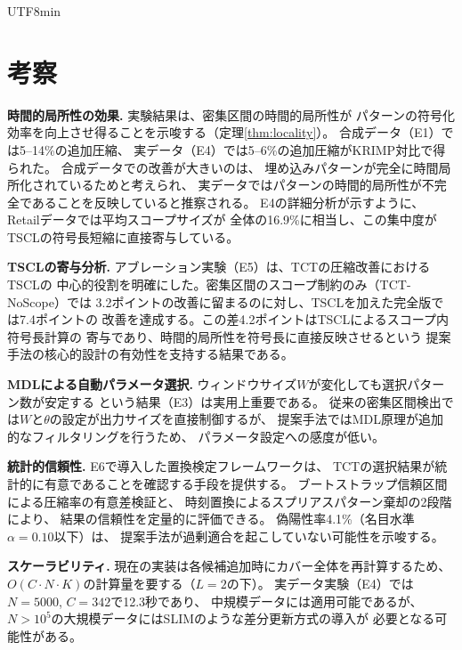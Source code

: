 \documentclass[11pt,a4paper]{article}
\begin{document}
\begin{CJK}{UTF8}{min}
\section{考察}\label{sec:discussion}

\textbf{時間的局所性の効果.}
実験結果は、密集区間の時間的局所性が
パターンの符号化効率を向上させ得ることを示唆する（定理\ref{thm:locality}）。
合成データ（E1）では5--14\%の追加圧縮、
実データ（E4）では5--6\%の追加圧縮がKRIMP対比で得られた。
合成データでの改善が大きいのは、
埋め込みパターンが完全に時間局所化されているためと考えられ、
実データではパターンの時間的局所性が不完全であることを反映していると推察される。
E4の詳細分析が示すように、Retailデータでは平均スコープサイズが
全体の16.9\%に相当し、この集中度がTSCLの符号長短縮に直接寄与している。

\textbf{TSCLの寄与分析.}
アブレーション実験（E5）は、TCTの圧縮改善におけるTSCLの
中心的役割を明確にした。密集区間のスコープ制約のみ（TCT-NoScope）では
3.2ポイントの改善に留まるのに対し、TSCLを加えた完全版では7.4ポイントの
改善を達成する。この差4.2ポイントはTSCLによるスコープ内符号長計算の
寄与であり、時間的局所性を符号長に直接反映させるという
提案手法の核心的設計の有効性を支持する結果である。

\textbf{MDLによる自動パラメータ選択.}
ウィンドウサイズ$W$が変化しても選択パターン数が安定する
という結果（E3）は実用上重要である。
従来の密集区間検出では$W$と$\theta$の設定が出力サイズを直接制御するが、
提案手法ではMDL原理が追加的なフィルタリングを行うため、
パラメータ設定への感度が低い。

\textbf{統計的信頼性.}
E6で導入した置換検定フレームワークは、
TCTの選択結果が統計的に有意であることを確認する手段を提供する。
ブートストラップ信頼区間による圧縮率の有意差検証と、
時刻置換によるスプリアスパターン棄却の2段階により、
結果の信頼性を定量的に評価できる。
偽陽性率4.1\%（名目水準$\alpha{=}0.10$以下）は、
提案手法が過剰適合を起こしていない可能性を示唆する。

\textbf{スケーラビリティ.}
現在の実装は各候補追加時にカバー全体を再計算するため、
$O(C \cdot N \cdot K)$の計算量を要する（$L{=}2$の下）。
実データ実験（E4）では$N{=}5000$, $C{=}342$で12.3秒であり、
中規模データには適用可能であるが、
$N > 10^5$の大規模データにはSLIMのような差分更新方式の導入が
必要となる可能性がある。


\end{CJK}
\end{document}
